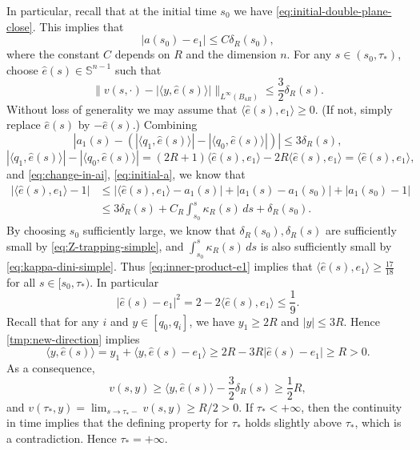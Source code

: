 \documentclass[11pt]{article}
\numberwithin{equation}{section}
\theoremstyle{definition}
\begin{document}
In particular, recall that at the initial time $s_0$ we have \eqref{eq:initial-double-plane-close}. This implies that
\begin{equation}\label{eq:initial-a}
    |a(s_0) - e_1| \leq C\delta_R(s_0), 
\end{equation} 
where the constant $C$ depends on $R$ and the dimension $n$.
For any $s \in (s_0,\tau_*)$, choose
\(\hat e(s)\in\mathbb S^{n-1}\) such that
\begin{equation*}
    \|v(s,\cdot)-|\langle y,\hat e(s)\rangle|\|_{L^\infty(B_{4R})}
    \leq \frac32 \delta_R(s).
\end{equation*}
Without loss of generality we may assume that $\langle \hat e(s), e_1 \rangle \geq 0$. (If not, simply replace $\hat e(s)$ by $-\hat e(s)$.) Combining
\begin{equation}\label{tmp:small-in-e1}
     \left|a_1(s) - (|\langle q_1, \hat e(s) \rangle| - |\langle q_0, \hat e(s) \rangle| ) \right| \leq 3\delta_R(s), 
\end{equation}
\begin{equation}\label{tmp:proj-in-e1}
    |\langle q_1, \hat e(s) \rangle| - |\langle q_0, \hat e(s) \rangle| = (2R+1)\langle \hat e(s), e_1 \rangle - 2R \langle \hat e(s), e_1 \rangle = \langle \hat e(s), e_1 \rangle,  
\end{equation} 
and \eqref{eq:change-in-ai}, \eqref{eq:initial-a}, we know that
\begin{align}
    |\langle \hat e(s), e_1 \rangle - 1| & \leq |\langle \hat e(s), e_1 \rangle - a_1(s)| + |a_1(s) - a_1(s_0)| + |a_1(s_0)-1| \nonumber \\
    & \leq 3\delta_R(s) + C_R \int_{s_0}^s \kappa_R(s)\, ds + \delta_R(s_0).\label{eq:inner-product-e1} 
\end{align} 
By choosing $s_0$ sufficiently large, we know that $\delta_R(s_0), \delta_R(s)$ are sufficiently small by \eqref{eq:Z-trapping-simple}, and $\int_{s_0}^s \kappa_R(s)\, ds$ is also sufficiently small by \eqref{eq:kappa-dini-simple}. Thus \eqref{eq:inner-product-e1} implies that $\langle \hat e(s), e_1 \rangle \geq \frac{17}{18}$ for all $s\in [s_0,\tau_*)$. In particular
\begin{equation}\label{tmp:new-direction}
    |\hat e(s) - e_1|^2 = 2-2\langle \hat e(s), e_1 \rangle \leq \frac19. 
\end{equation} 
Recall that for any $i$ and $y\in [q_0,q_i]$, we have $y_1\geq 2R$ and $|y|\leq 3R$. Hence \eqref{tmp:new-direction} implies
\[
    \langle y,\hat e(s)\rangle
    =y_1+\langle y,\hat e(s)-e_1\rangle
    \geq 2R-3R|\hat e(s)-e_1|
    \geq R > 0.
\]
As a consequence,
\[ v(s,y) \geq \langle y,\hat e(s)\rangle - \frac32 \delta_R(s) \geq \frac12 R, \]
and $v(\tau_*,y) = \lim_{s\to \tau_* -} v(s,y) \geq R/2 > 0$. 
If $\tau_*< +\infty$, then the continuity in time implies that the defining property for $\tau_*$ holds slightly above $\tau_*$, which is a contradiction. Hence $\tau_* = +\infty$.
\end{document}
